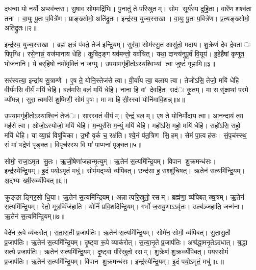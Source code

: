 द॒ध॒न्वा यो नर्यो॑ अ॒प्स्व॑न्तरा। सु॒षाव॒ सोम॒मद्रि॑भिः। पु॒नातु॑ ते परि॒स्रुतम्। सोम॒ सूर्य॑स्य दुहि॒ता। वारे॑ण॒ शश्व॑ता॒ तना। वा॒युः पू॒तः प॒वित्रे॑ण। प्राङ्ख्सोमो॒ अति॑द्रुतः। इन्द्र॑स्य॒ युज्य॒स्सखा। वा॒युः पू॒तः प॒वित्रे॑ण। प्र॒त्यङ्ख्सोमो॒ अति॑द्रुतः॥२॥

इन्द्र॑स्य॒ युज्य॒स्सखा। ब्रह्म॑ क्ष॒त्रं प॑वते॒ तेज॑ इन्द्रि॒यम्। सुर॑या॒ सोम॑स्सु॒त आसु॑तो॒ मदा॑य। शु॒क्रेण॑ देव दे॒वताः पिपृग्धि। रसे॒नान्नं॒ यज॑मानाय धेहि। कु॒विद॒ङ्ग यव॑मन्तो॒ यवं॑चित्। यथा॒ दान्त्य॑नुपू॒र्वं वि॒यूय॑। इ॒हेहै॑षां कृणुत॒ भोज॑नानि। ये ब॒र्‌हिषो॒ नमो॑वृक्तिं॒ न ज॒ग्मुः। उ॒प॒या॒मगृ॑हीतोऽस्य॒श्विभ्यां त्वा॒ जुष्टं॑ गृह्णामि॥३॥

सर॑स्वत्या॒ इन्द्रा॑य सु॒त्राम्णे। ए॒ष ते॒ योनि॒स्तेज॑से त्वा। वी॒र्या॑य त्वा॒ बला॑य त्वा। तेजो॑ऽसि॒ तेजो॒ मयि॑ धेहि। वी॒र्य॑मसि वी॒र्यं॑ मयि॑ धेहि। बल॑मसि॒ बलं॒ मयि॑ धेहि। नाना॒ हि वां दे॒वहि॑त॒ सद॑ः कृ॒तम्। मा ससृ॑क्षाथां पर॒मे व्यो॑मन्न्। सुरा॒ त्वमसि॑ शु॒ष्मिणी॒ सोम॑ ए॒षः। मा मा॑ हिसी॒स्स्वां योनि॑मावि॒शन्न्॥४॥

उ॒प॒या॒मगृ॑हीतोऽस्याश्वि॒नं तेज॑ः। सा॒र॒स्व॒तं वी॒र्यम्। ऐ॒न्द्रं बलम्। ए॒ष ते॒ योनि॒र्मोदा॑य त्वा। आ॒न॒न्दाय॑ त्वा॒ मह॑से त्वा। ओजो॒ऽस्योजो॒ मयि॑ धेहि। म॒न्युर॑सि म॒न्युं मयि॑ धेहि। महो॑ऽसि॒ महो॒ मयि॑ धेहि। सहो॑ऽसि॒ सहो॒ मयि॑ धेहि। या व्या॒घ्रं विषू॑चिका। उ॒भौ वृकं॑ च॒ रक्ष॑ति। श्ये॒नं प॑त॒त्रिण सि॒हम्। सेमं पा॒त्वह॑सः। सं॒पृच॑स्स्थ॒ सं मा॑ भ॒द्रेण॑ पृङ्क्त। वि॒पृच॑स्स्थ॒ वि मा॑ पा॒प्मना॑ पृङ्क्त॥५॥


सोमो॒ राजा॒ऽमृत सु॒तः। ऋ॒जी॒षेणा॑जहान्मृ॒त्युम्। ऋ॒तेन॑ स॒त्यमि॑न्द्रि॒यम्। विपान शु॒क्रमन्ध॑सः। इन्द्र॑स्येन्द्रि॒यम्। इ॒दं पयो॒ऽमृतं॒ मधु॑। सोम॑म॒द्भ्यो व्य॑पिबत्। छन्द॑सा ह॒सश्शु॑चि॒षत्। ऋ॒तेन॑ स॒त्यमि॑न्द्रि॒यम्। अ॒द्भ्यः ख्षी॒रव्व्यँ॑पिबत्॥६॥

क्रुङ्ङाङ्गिर॒सो धि॒या। ऋ॒तेन॑ स॒त्यमि॑न्द्रि॒यम्। अन्नात्परि॒स्रुतो॒ रसम्। ब्रह्म॑णा॒ व्य॑पिबत् ख्ष॒त्रम्। ऋ॒तेन॑ स॒त्यमि॑न्द्रि॒यम्। रेतो॒ मूत्र॒व्विँज॑हाति। योनिं॑ प्रवि॒शदि॑न्द्रि॒यम्। गर्भो॑ ज॒रायु॒णाऽऽवृ॑तः। उल्ब॑ञ्जहाति॒ जन्म॑ना। ऋ॒तेन॑ स॒त्यमि॑न्द्रि॒यम्॥७॥

वेदे॑न रू॒पे व्य॑करोत्। स॒ता॒स॒ती प्र॒जाप॑तिः। ऋ॒तेन॑ स॒त्यमि॑न्द्रि॒यम्। सोमे॑न॒ सोमौ॒ व्य॑पिबत्। सु॒ता॒सु॒तौ प्र॒जाप॑तिः। ऋ॒तेन॑ स॒त्यमि॑न्द्रि॒यम्। दृ॒ष्ट्वा रू॒पे व्याक॑रोत्। स॒त्या॒नृ॒ते प्र॒जाप॑तिः। अश्र॑द्धा॒मनृ॒तेऽद॑धात्। श्र॒द्धा स॒त्ये प्र॒जाप॑तिः। ऋ॒तेन॑ स॒त्यमि॑न्द्रि॒यम्। दृ॒ष्ट्वा प॑रि॒स्रुतो॒ रसम्। शु॒क्रेण॑ शु॒क्रव्व्यँ॑पिबत्। पय॒स्सोमं॑ प्र॒जाप॑तिः। ऋ॒तेन॑ स॒त्यमि॑न्द्रि॒यम्। विपान शु॒क्रमन्ध॑सः। इन्द्र॑स्येन्द्रि॒यम्। इ॒दं पयो॒ऽमृतं॒ मधु॑॥८॥

